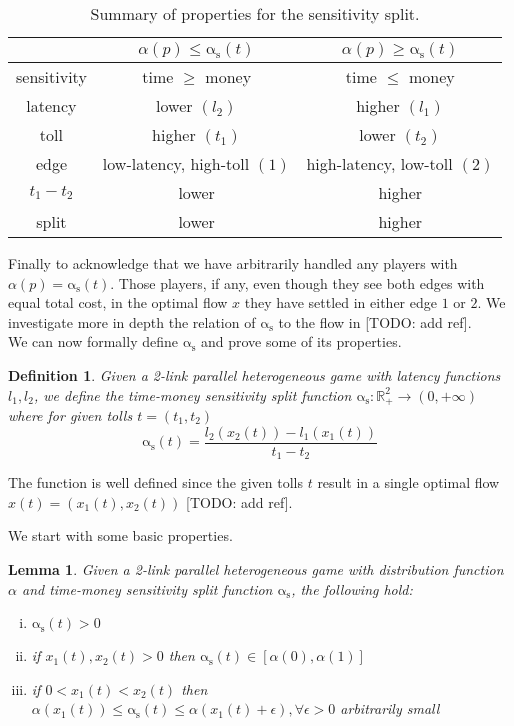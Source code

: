 \documentclass[a4paper,11pt]{article}
\newcommand{\as}{\mathrm{\alpha_s}}
\newtheorem{definition}{Definition}[section]
\newtheorem{lemma}{Lemma}[section]
\begin{document}
\begin{table}[h!]
	\centering
	\caption{Summary of properties for the sensitivity split.}
	\begin{tabular}{| c || c | c |}
		\hline
		& $\alpha(p) \le \as(t)$ & $\alpha(p) \ge \as(t)$ \\ \hline
		sensitivity & time $\ge$ money & time $\le$ money \\ \hline
		latency & lower $(l_2)$ & higher $(l_1)$ \\ \hline
		toll & higher $(t_1)$ & lower $(t_2)$ \\ \hline
		edge & low-latency, high-toll $(1)$ & high-latency, low-toll $(2)$ \\ \hline
		$t_1 - t_2$ & lower & higher \\ \hline
		split & lower & higher \\ \hline
	\end{tabular}
	\label{table:split_summary}
\end{table}

Finally to acknowledge that we have arbitrarily handled any players with $\alpha(p) = \as(t)$.
Those players, if any, even though they see both edges with equal total cost, in the optimal flow $x$ they have settled in either edge $1$ or $2$.
We investigate more in depth the relation of $\as$ to the flow in [TODO: add ref].
\\[12pt]
We can now formally define $\as$ and prove some of its properties.
\begin{definition}
	Given a 2-link parallel heterogeneous game with latency functions $l_1, l_2$, we define the time-money sensitivity split function $\as: \mathbb{R}^2_+ \rightarrow (0, +\infty)$ where for given tolls $t = (t_1, t_2)$
	\[\as(t) = \frac{l_2(x_2(t)) - l_1(x_1(t))}{t_1 - t_2}\]
\end{definition}
The function is well defined since the given tolls $t$ result in a single optimal flow $x(t) = (x_1(t), x_2(t))$ [TODO: add ref].

We start with some basic properties.
\begin{lemma}
	\label{lemma:split_basic}
	Given a 2-link parallel heterogeneous game with distribution function $\alpha$ and time-money sensitivity split function $\as$, the following hold:
	\begin{enumerate}[(i)]
		\item $\as(t) > 0$
		\item if $x_1(t), x_2(t) > 0$ then $\as(t) \in [\alpha(0), \alpha(1)]$
		\item if $0 < x_1(t) < x_2(t)$ then $\alpha(x_1(t)) \le \as(t) \le \alpha(x_1(t) + \epsilon), \forall \epsilon > 0$ arbitrarily small
	\end{enumerate}
\end{lemma}
\end{document}
